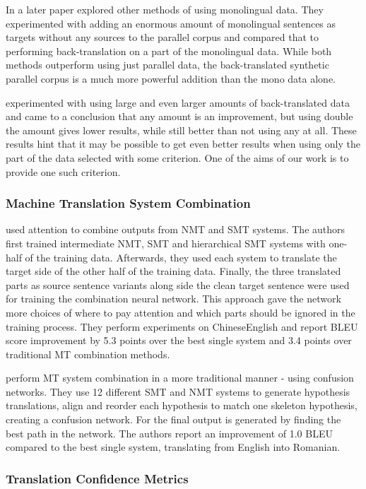 \documentclass[]{article}
\begin{document}
In a later paper \citet{sennrich-haddow-birch:2016:P16-11} explored other methods of using monolingual data. They experimented with adding an enormous amount of monolingual sentences as targets without any sources to the parallel corpus and compared that to performing back-translation on a part of the monolingual data. While both methods outperform using just parallel data, the back-translated synthetic parallel corpus is a much more powerful addition than the mono data alone.

\citet{pinnis2017neural} experimented with using large and even larger amounts of back-translated data and came to a conclusion that any amount is an improvement, but using double the amount gives lower results, while still better than not using any at all. These results hint that it may be possible to get even better results when using only the part of the data selected with some criterion. One of the aims of our work is to provide one such criterion.

\subsubsection*{Machine Translation System Combination}

\citet{Zhou2017} used attention to combine outputs from NMT and SMT systems. The authors first trained intermediate NMT, SMT and hierarchical SMT systems with one-half of the training data. Afterwards, they used each system to translate the target side of the other half of the training data. Finally, the three translated parts as source sentence variants along side the clean target sentence were used for training the combination neural network. This approach gave the network more choices of where to pay attention and which parts should be ignored in the training process. They perform experiments on ChineseEnglish and report BLEU score improvement by 5.3 points over the best single system and 3.4 points over traditional MT combination methods.

\citet{Peter2016} perform MT system combination in a more traditional manner - using confusion networks. They use 12 different SMT and NMT systems to generate hypothesis translations, align and reorder each hypothesis to match one skeleton hypothesis, creating a confusion network. For the final output is generated by finding the best path in the network. The authors report an improvement of 1.0 BLEU compared to the best single system, translating from English into Romanian.

\subsubsection*{Translation Confidence Metrics}
\end{document}
